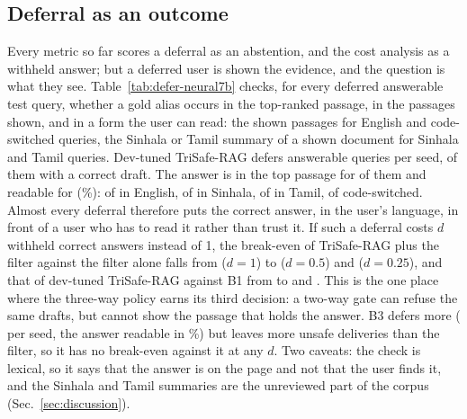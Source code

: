 \subsection{Deferral as an outcome}\label{sec:defer}

Every metric so far scores a deferral as an abstention, and the cost analysis as a withheld answer; but a deferred user is shown the evidence, and the question is what they see. Table~\ref{tab:defer-neural7b} checks, for every deferred answerable test query, whether a gold alias occurs in the top-ranked passage, in the \LDeferK{} passages shown, and in a form the user can read: the shown passages for English and code-switched queries, the Sinhala or Tamil summary of a shown document for Sinhala and Tamil queries. Dev-tuned TriSafe-RAG defers \LTunDeferN{} answerable queries per seed, \LTunDeferCorrectDraft{} of them with a correct draft. The answer is in the top passage for \LTunDeferVisTopone{} of them and readable for \LTunDeferVisRead{} (\LTunDeferVisReadPct\%): \LTunDeferVisReaden{} of \LTunDeferNen{} in English, \LTunDeferVisReadsi{} of \LTunDeferNsi{} in Sinhala, \LTunDeferVisReadta{} of \LTunDeferNta{} in Tamil, \LTunDeferVisReadmixed{} of \LTunDeferNmixed{} code-switched. Almost every deferral therefore puts the correct answer, in the user's language, in front of a user who has to read it rather than trust it. If such a deferral costs $d$ withheld correct answers instead of 1, the break-even of TriSafe-RAG plus the filter against the filter alone falls from \LTemptyDeferBreakEvenEmptyDfull{} ($d{=}1$) to \LTemptyDeferBreakEvenEmptyDhalf{} ($d{=}0.5$) and \LTemptyDeferBreakEvenEmptyDquarter{} ($d{=}0.25$), and that of dev-tuned TriSafe-RAG against B1 from \LTunDeferBreakEvenBoneDfull{} to \LTunDeferBreakEvenBoneDhalf{} and \LTunDeferBreakEvenBoneDquarter. This is the one place where the three-way policy earns its third decision: a two-way gate can refuse the same drafts, but cannot show the passage that holds the answer. B3 defers more (\LBthreeDeferN{} per seed, the answer readable in \LBthreeDeferVisReadPct\%) but leaves more unsafe deliveries than the filter, so it has no break-even against it at any $d$. Two caveats: the check is lexical, so it says that the answer is on the page and not that the user finds it, and the Sinhala and Tamil summaries are the unreviewed part of the corpus (Sec.~\ref{sec:discussion}).

